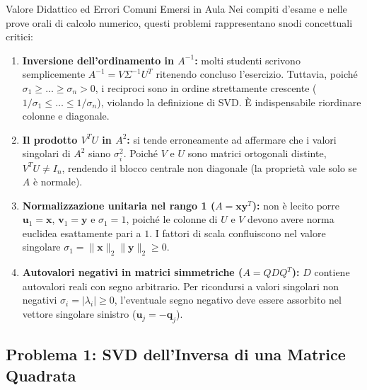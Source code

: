 \begin{noteblock}{Valore Didattico ed Errori Comuni Emersi in Aula}
Nei compiti d'esame e nelle prove orali di calcolo numerico, questi problemi rappresentano snodi concettuali critici:
\begin{enumerate}
    \item \textbf{Inversione dell'ordinamento in $A^{-1}$:} molti studenti scrivono semplicemente $A^{-1} = V \Sigma^{-1} U^T$ ritenendo concluso l'esercizio. Tuttavia, poich\'e $\sigma_1 \ge \dots \ge \sigma_n > 0$, i reciproci sono in ordine strettamente crescente ($1/\sigma_1 \le \dots \le 1/\sigma_n$), violando la definizione di SVD. \`E indispensabile riordinare colonne e diagonale.
    \item \textbf{Il prodotto $V^T U$ in $A^2$:} si tende erroneamente ad affermare che i valori singolari di $A^2$ siano $\sigma_i^2$. Poich\'e $V$ e $U$ sono matrici ortogonali distinte, $V^T U \neq I_n$, rendendo il blocco centrale non diagonale (la propriet\`a vale solo se $A$ \`e normale).
    \item \textbf{Normalizzazione unitaria nel rango 1 ($A = \mathbf{x} \mathbf{y}^T$):} non \`e lecito porre $\mathbf{u}_1 = \mathbf{x}$, $\mathbf{v}_1 = \mathbf{y}$ e $\sigma_1 = 1$, poich\'e le colonne di $U$ e $V$ devono avere norma euclidea esattamente pari a $1$. I fattori di scala confluiscono nel valore singolare $\sigma_1 = \|\mathbf{x}\|_2 \|\mathbf{y}\|_2 \ge 0$.
    \item \textbf{Autovalori negativi in matrici simmetriche ($A = Q D Q^T$):} $D$ contiene autovalori reali con segno arbitrario. Per ricondursi a valori singolari non negativi $\sigma_i = |\lambda_i| \ge 0$, l'eventuale segno negativo deve essere assorbito nel vettore singolare sinistro ($\mathbf{u}_j = -\mathbf{q}_j$).
\end{enumerate}
\end{noteblock}

\subsection{Problema 1: SVD dell'Inversa di una Matrice Quadrata}

